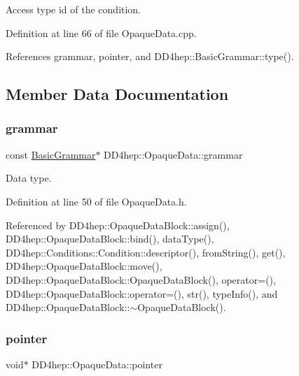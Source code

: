 Access type id of the condition. 



Definition at line 66 of file Opaque\+Data.\+cpp.



References grammar, pointer, and D\+D4hep\+::\+Basic\+Grammar\+::type().



\subsection{Member Data Documentation}
\hypertarget{class_d_d4hep_1_1_opaque_data_ac911f7e23be3e5d583bf5ccebae03e31}{}\label{class_d_d4hep_1_1_opaque_data_ac911f7e23be3e5d583bf5ccebae03e31} 
\subsubsection{\texorpdfstring{grammar}{grammar}}
{\footnotesize\ttfamily const \hyperlink{class_d_d4hep_1_1_basic_grammar}{Basic\+Grammar}$\ast$ D\+D4hep\+::\+Opaque\+Data\+::grammar}



Data type. 



Definition at line 50 of file Opaque\+Data.\+h.



Referenced by D\+D4hep\+::\+Opaque\+Data\+Block\+::assign(), D\+D4hep\+::\+Opaque\+Data\+Block\+::bind(), data\+Type(), D\+D4hep\+::\+Conditions\+::\+Condition\+::descriptor(), from\+String(), get(), D\+D4hep\+::\+Opaque\+Data\+Block\+::move(), D\+D4hep\+::\+Opaque\+Data\+Block\+::\+Opaque\+Data\+Block(), operator=(), D\+D4hep\+::\+Opaque\+Data\+Block\+::operator=(), str(), type\+Info(), and D\+D4hep\+::\+Opaque\+Data\+Block\+::$\sim$\+Opaque\+Data\+Block().

\hypertarget{class_d_d4hep_1_1_opaque_data_af7f449f3359f7f7a7190e6c9467d01fe}{}\label{class_d_d4hep_1_1_opaque_data_af7f449f3359f7f7a7190e6c9467d01fe} 
\subsubsection{\texorpdfstring{pointer}{pointer}}
{\footnotesize\ttfamily void$\ast$ D\+D4hep\+::\+Opaque\+Data\+::pointer\hspace{0.3cm}{\ttfamily [protected]}}



